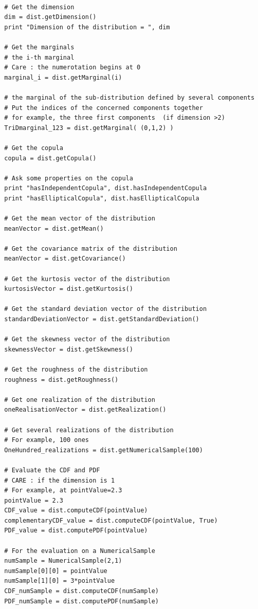 \begin{lstlisting}

  # Get the dimension
  dim = dist.getDimension()
  print "Dimension of the distribution = ", dim

  # Get the marginals
  # the i-th marginal
  # Care : the numerotation begins at 0
  marginal_i = dist.getMarginal(i)

  # the marginal of the sub-distribution defined by several components
  # Put the indices of the concerned components together
  # for example, the three first components  (if dimension >2)
  TriDmarginal_123 = dist.getMarginal( (0,1,2) )

  # Get the copula
  copula = dist.getCopula()

  # Ask some properties on the copula
  print "hasIndependentCopula", dist.hasIndependentCopula
  print "hasEllipticalCopula", dist.hasEllipticalCopula

  # Get the mean vector of the distribution
  meanVector = dist.getMean()

  # Get the covariance matrix of the distribution
  meanVector = dist.getCovariance()

  # Get the kurtosis vector of the distribution
  kurtosisVector = dist.getKurtosis()

  # Get the standard deviation vector of the distribution
  standardDeviationVector = dist.getStandardDeviation()

  # Get the skewness vector of the distribution
  skewnessVector = dist.getSkewness()

  # Get the roughness of the distribution
  roughness = dist.getRoughness()

  # Get one realization of the distribution
  oneRealisationVector = dist.getRealization()

  # Get several realizations of the distribution
  # For example, 100 ones
  OneHundred_realizations = dist.getNumericalSample(100)

  # Evaluate the CDF and PDF
  # CARE : if the dimension is 1
  # For example, at pointValue=2.3
  pointValue = 2.3
  CDF_value = dist.computeCDF(pointValue)
  complementaryCDF_value = dist.computeCDF(pointValue, True)
  PDF_value = dist.computePDF(pointValue)

  # For the evaluation on a NumericalSample
  numSample = NumericalSample(2,1)
  numSample[0][0] = pointValue
  numSample[1][0] = 3*pointValue
  CDF_numSample = dist.computeCDF(numSample)
  PDF_numSample = dist.computePDF(numSample)


\end{lstlisting}
